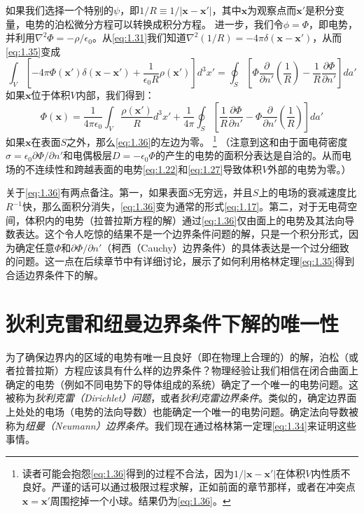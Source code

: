\documentclass[12pt]{book}
\numberwithin{equation}{chapter}
\numberwithin{figure}{chapter}
\numberwithin{footnote}{page}
\begin{document}
如果我们选择一个特别的$\psi$，即$1/R\equiv1/|\mathbf{x}-\mathbf{x'}|$，其中$\mathbf{x}$为观察点而$\mathbf{x'}$是积分变量，电势的泊松微分方程可以转换成积分方程。
进一步，我们令$\phi=\Phi$，即电势，并利用$\nabla^2\Phi=-\rho/\epsilon_0$。从\autoref{eq:1.31}我们知道$\nabla^2(1/R)=-4\pi\delta(\mathbf{x}-\mathbf{x'})$，从而\autoref{eq:1.35}变成
$$\int_V [-4\pi\Phi(\mathbf{x'})\delta(\mathbf{x}-\mathbf{x'})+\frac{1}{\epsilon_0R}\rho(\mathbf{x'})]d^3x'=\oint_S [\Phi\frac{\partial}{\partial n'}(\frac{1}{R})-\frac{1}{R}\frac{\partial \Phi}{\partial n'}]da'$$
如果$\mathbf{x}$位于体积$V$内部，我们得到：
\begin{equation}\label{eq:1.36}
    \Phi(\mathbf{x})=\frac{1}{4\pi\epsilon_0}\int_V \frac{\rho(\mathbf{x'})}{R}d^3x'+\frac{1}{4\pi}\oint_S [\frac{1}{R}\frac{\partial \Phi}{\partial n'}-\Phi \frac{\partial}{\partial n'}(\frac{1}{R})]da'
\end{equation}
如果$\mathbf{x}$在表面$S$之外，那么\autoref{eq:1.36}的左边为零。
\footnote{读者可能会抱怨\autoref{eq:1.36}得到的过程不合法，因为$1/|\mathbf{x}-\mathbf{x'}|$在体积$V$内性质不良好。严谨的话可以通过极限过程求解，正如前面的章节那样，或者在冲突点$\mathbf{x}=\mathbf{x'}$周围挖掉一个小球。结果仍为\autoref{eq:1.36}。}
（注意到这和由于面电荷密度$\sigma=\epsilon_0 \partial\Phi/\partial n'$和电偶极层$D=-\epsilon_0 \Phi$的产生的电势的面积分表达是自洽的。从而电场的不连续性和跨越表面的电势\autoref{eq:1.22}和\autoref{eq:1.27}导致体积$V$外部的电势为零。）

关于\autoref{eq:1.36}有两点备注。第一，如果表面$S$无穷远，并且$S$上的电场的衰减速度比$R^{-1}$快，那么面积分消失，\autoref{eq:1.36}变为通常的形式\autoref{eq:1.17}。第二，对于无电荷空间，体积内的电势（拉普拉斯方程的解）通过\autoref{eq:1.36}仅由面上的电势及其法向导数表达。这个令人吃惊的结果不是一个边界条件问题的解，只是一个积分形式，因为确定任意$\Phi$和$\partial \Phi/\partial n'$（柯西（Cauchy）边界条件）的具体表达是一个过分细致的问题。这一点在后续章节中有详细讨论，展示了如何利用格林定理\autoref{eq:1.35}得到合适边界条件下的解。

\section{狄利克雷和纽曼边界条件下解的唯一性}\label{sec:1.9}

为了确保边界内的区域的电势有唯一且良好（即在物理上合理的）的解，泊松（或者拉普拉斯）方程应该具有什么样的边界条件？物理经验让我们相信在闭合曲面上确定的电势（例如不同电势下的导体组成的系统）确定了一个唯一的电势问题。这被称为\textit{狄利克雷（Dirichlet）问题}，或者\textit{狄利克雷边界条件}。类似的，确定边界面上处处的电场（电势的法向导数）也能确定一个唯一的电势问题。确定法向导数被称为\textit{纽曼（Neumann）边界条件}。我们现在通过格林第一定理\autoref{eq:1.34}来证明这些事情。
\end{document}
